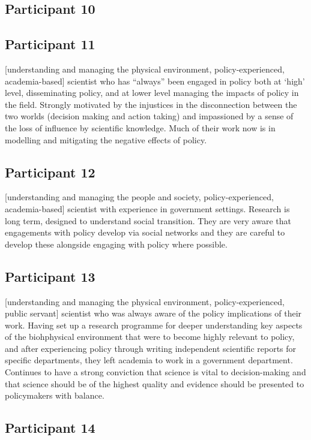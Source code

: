 \subsection{Participant 10}\label{sec:p10}
\subsection{Participant 11}\label{sec:p11}
[understanding and managing the physical environment, policy-experienced, academia-based] scientist who has ``always'' been engaged in policy both at `high' level, disseminating policy, and at lower level managing the impacts of policy in the field. Strongly motivated by the injustices in the disconnection between the two worlds (decision making and action taking) and impassioned by a sense of the loss of influence by scientific knowledge. Much of their work now is in modelling and mitigating the negative effects of policy. 

\subsection{Participant 12}\label{sec:p12}
[understanding and managing the people and society, policy-experienced, academia-based] scientist with experience in government settings. Research is long term, designed to understand social transition. They are very aware that engagements with policy develop via social networks and they are careful to develop these alongside engaging with policy where possible. 

\subsection{Participant 13}\label{sec:p13}
[understanding and managing the physical environment, policy-experienced, public servant] scientist who was always aware of the policy implications of their work. Having set up a research programme for deeper understanding key aspects of the biohphysical environment that were to become highly relevant to policy, and after experiencing policy through writing independent scientific reports for specific departments, they left academia to work in a government department. Continues to have a strong conviction that science is vital to decision-making and that science should be of the highest quality and evidence should be presented to policymakers with balance. 

\subsection{Participant 14}\label{sec:p14}

